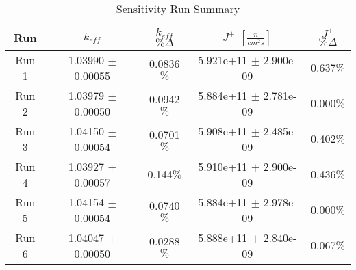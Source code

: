 
\begin{table}[H]
\centering
 \begin{tabularx}{0.7\textwidth}{c  c  c  c  c}
 	\hline
 	Run & $k_{eff}$ & $k_{eff}$ $\% \Delta$ & $J^+$  $[\frac{n}{cm^2s}]$ & $J^+$ $\% \Delta$  \\
 	\hline
 	Run 1 & 1.03990 $\pm$ 0.00055 & 0.0836$\%$ & 5.921e+11 $\pm$ 2.900e-09 & 0.637$\%$ \\
 	Run 2 & 1.03979 $\pm$ 0.00050 & 0.0942$\%$ & 5.884e+11 $\pm$ 2.781e-09 & 0.000$\%$ \\
 	Run 3 & 1.04150 $\pm$ 0.00054 & 0.0701$\%$ & 5.908e+11 $\pm$ 2.485e-09 & 0.402$\%$ \\
 	Run 4 & 1.03927 $\pm$ 0.00057 & 0.144$\%$ & 5.910e+11 $\pm$ 2.900e-09 & 0.436$\%$ \\
 	Run 5 & 1.04154 $\pm$ 0.00054 & 0.0740$\%$ & 5.884e+11 $\pm$ 2.978e-09 & 0.000$\%$ \\
 	Run 6 & 1.04047 $\pm$ 0.00050 & 0.0288$\%$ & 5.888e+11 $\pm$ 2.840e-09 & 0.067$\%$ \\
 	\hline

 \end{tabularx}
\caption{Sensitivity Run Summary}
\label{table:slicesens}
\end{table}